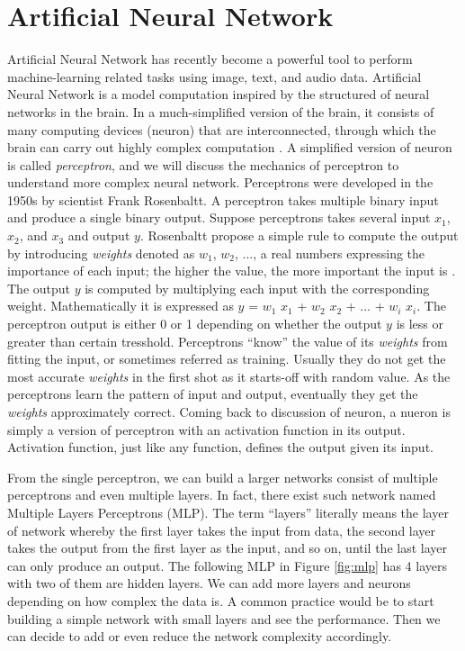 \section{Artificial Neural Network}
Artificial Neural Network has recently become a powerful tool to perform machine-learning related tasks using image, text, and audio data. Artificial Neural Network is a model computation inspired by the structured of neural networks in the brain. In a much-simplified version of the brain, it consists of many computing devices (neuron) that are interconnected, through which the brain can carry out highly complex computation \cite{shwartzdavid2014}. A simplified version of neuron is called \emph{perceptron}, and we will discuss the mechanics of perceptron to understand more complex neural network. Perceptrons were developed in the 1950s by scientist Frank Rosenbaltt. A perceptron takes multiple binary input and produce a single binary output. Suppose perceptrons takes several input $x_1$, $x_2$, and $x_3$ and output $y$. Rosenbaltt propose a simple rule to compute the output by introducing \emph{weights} denoted as $w_1$, $w_2$, ..., a real numbers expressing the importance of each input; the higher the value, the more important the input is \cite{nielsenneural}. The output $y$ is computed by multiplying each input with the corresponding weight. Mathematically it is expressed as $y$ = $w_1$ $x_1$ + $w_2$ $x_2$ + ... + $w_i$ $x_i$. The perceptron output is either 0 or 1 depending on whether the output $y$ is less or greater than certain tresshold. Perceptrons ``know'' the value of its \emph{weights} from fitting the input, or sometimes referred as training. Usually they do not get the most accurate \emph{weights} in the first shot as it starts-off with random value. As the perceptrons learn the pattern of input and output, eventually they get the \emph{weights} approximately correct. Coming back to discussion of neuron, a nueron is simply a version of perceptron with an activation function in its output. Activation function, just like any function, defines the output given its input.

From the single perceptron, we can build a larger networks consist of multiple perceptrons and even multiple layers. In fact, there exist such network named Multiple Layers Perceptrons (MLP). The term ``layers'' literally means the layer of network whereby the first layer takes the input from data, the second layer takes the output from the first layer as the input, and so on, until the last layer can only produce an output. The following MLP in Figure \ref{fig:mlp} has 4 layers with two of them are hidden layers. We can add more layers and neurons depending on how complex the data is. A common practice would be to start building a simple network with small layers and see the performance. Then we can decide to add or even reduce the network complexity accordingly.

